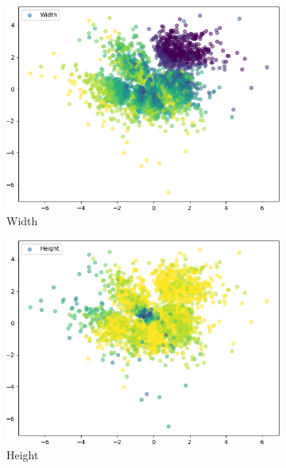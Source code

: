 \documentclass{beamer}
\begin{document}
\begin{frame}
\begin{figure}
\begin{subfigure}{.24\textwidth}
\includegraphics[width=\textwidth]{images/latent_spaces/mnist/vae/embeddings_mu_4.png}
\caption{Width}
\end{subfigure}
\hfill
\begin{subfigure}{.24\textwidth}
\includegraphics[width=\textwidth]{images/latent_spaces/mnist/vae/embeddings_mu_5.png}
\caption{Height}
\end{subfigure}
\hfill
\begin{subfigure}{.24\textwidth}

\end{subfigure}
\end{figure}
\end{frame}
\end{document}
